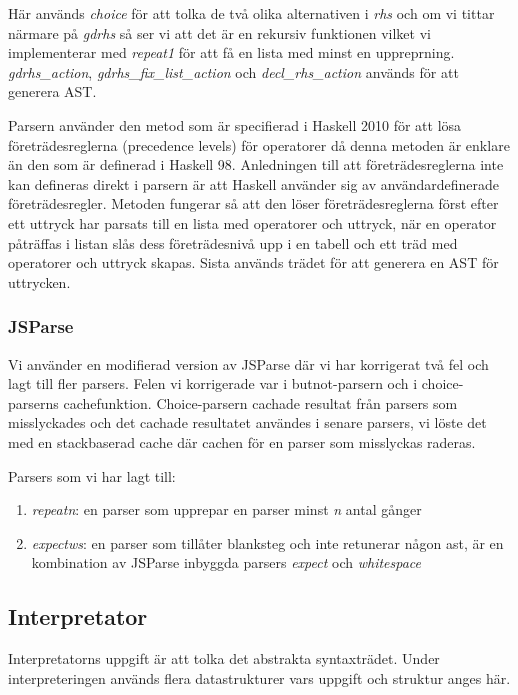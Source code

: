 Här används \emph{choice} för att tolka de två olika alternativen i \emph{rhs} och om vi tittar närmare på \emph{gdrhs} 
så ser vi att det är en rekursiv funktionen vilket vi implementerar med \emph{repeat1} för att få en lista med minst en uppreprning.
\emph{gdrhs_action}, \emph{gdrhs_fix_list_action} och \emph{decl_rhs_action} används för att generera AST.

Parsern använder den metod som är specifierad i Haskell 2010 \citep{haskell2010} för att lösa företrädesreglerna (precedence levels) för operatorer då denna metoden är enklare än den som är definerad i Haskell 98. 
Anledningen till att företrädesreglerna inte kan defineras direkt i parsern är att Haskell använder sig av användardefinerade företrädesregler.
Metoden fungerar så att den löser företrädesreglerna först efter ett uttryck har parsats till en lista med operatorer 
och uttryck, när en operator påträffas i listan slås dess företrädesnivå upp i en tabell och ett träd med 
operatorer och uttryck skapas. Sista används trädet för att generera en AST för uttrycken.

\subsubsection{JSParse}
Vi använder en modifierad version av JSParse där vi har korrigerat två fel och lagt till fler parsers. Felen vi korrigerade var i butnot-parsern och i choice-parserns cachefunktion. 
Choice-parsern cachade resultat från parsers som misslyckades och det cachade resultatet användes i senare parsers, 
vi löste det med en stackbaserad cache där cachen för en parser som misslyckas raderas.

Parsers som vi har lagt till:
\begin{enumerate}
    \item{\emph{repeatn}: en parser som upprepar en parser minst \emph{n} antal gånger}
    \item{\emph{expectws}: en parser som tillåter blanksteg och inte retunerar någon ast, är en kombination av JSParse inbyggda parsers \emph{expect} och \emph{whitespace}}
\end{enumerate}



\subsection{Interpretator}
Interpretatorns uppgift är att tolka det abstrakta syntaxträdet. Under interpreteringen används flera datastrukturer vars uppgift och struktur anges här.

